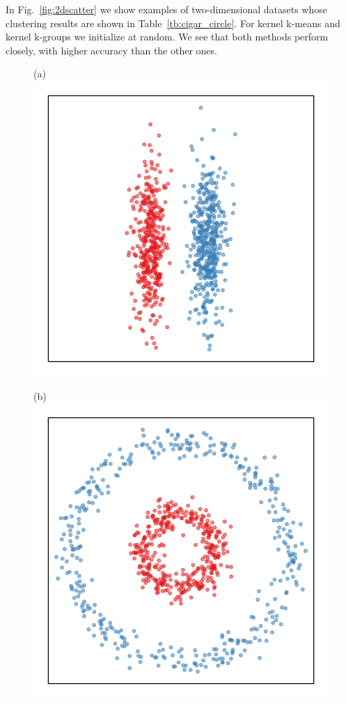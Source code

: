 \documentclass[10pt,journal,compsoc]{IEEEtran}
\begin{document}
In Fig.~\ref{fig:2dscatter} we show examples of two-dimensional
datasets whose clustering results are shown in Table~\ref{tb:cigar_circle}.
For kernel k-means and kernel k-groups we initialize at random.
We see that both methods perform closely, with higher accuracy
than the other ones.

\begin{figure}
\centering
\begin{minipage}{0.2\textwidth}
(a)~\includegraphics[width=.8\textwidth,trim=0 .8cm 0 0]{2cigars.pdf}%
\end{minipage}\hspace{2em}
\begin{minipage}{0.2\textwidth}
(b)~\includegraphics[width=.8\textwidth,trim=0 .8cm 0 0]{2circles.pdf}%

\end{minipage}
\end{figure}
\end{document}
